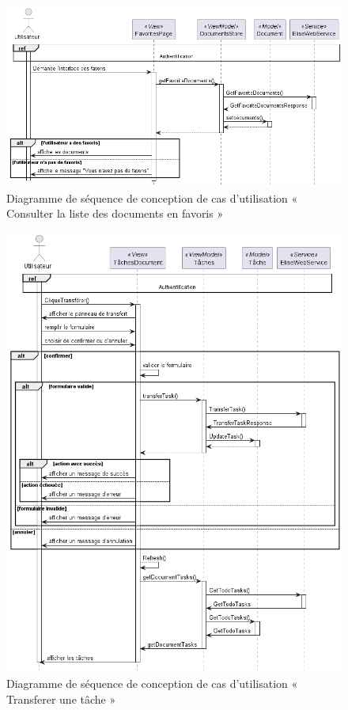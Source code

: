 \begin{figure}[H]
  \centering
  \includegraphics[width=1\textwidth]{out/diagrams/documents/sequence_favoris/sequence_favoris}
  \caption{Diagramme de séquence de conception de cas d'utilisation « Consulter la liste des documents en favoris »}
  \label{fig:sequence_conception_favoritDocument}
\end{figure}
\begin{figure}[H]
  \centering
  \includegraphics[width=1\textwidth]{out/diagrams/documents/sequence_transfer_task/sequence_transfer_task}
  \caption{Diagramme de séquence de conception de cas d'utilisation « Transferer une tâche »}
  \label{fig:sequence_conception_transferTask}
\end{figure}
